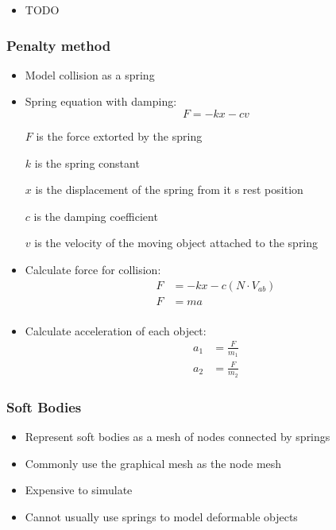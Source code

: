 \documentclass[a4paper]{article}
\begin{document}

\begin{itemize}
  \item
    TODO

\end{itemize}

\subsubsection{Penalty method}

\begin{itemize}
  \item
    Model collision as a spring

  \item
    Spring equation with damping:
    \[
      F = -kx - cv
    \]

    $F$ is the force extorted by the spring

    $k$ is the spring constant

    $x$ is the displacement of the spring from it s rest position

    $c$ is the damping coefficient

    $v$ is the velocity of the moving object attached to the spring

  \item
    Calculate force for collision:
    \begin{align*}
      F &= -kx - c(N \cdot V_{ab}) \\
      F &= ma \\
    \end{align*}

  \item
    Calculate acceleration of each object:
    \begin{align*}
      a_{1} &= \frac{F}{m_{1}} \\
      a_{2} &= \frac{F}{m_{2}}
    \end{align*}

\end{itemize}

\subsubsection{Soft Bodies}

\begin{itemize}
  \item
    Represent soft bodies as a mesh of nodes connected by springs

  \item
    Commonly use the graphical mesh as the node mesh

  \item
    Expensive to simulate

  \item
    Cannot usually use springs to model deformable objects

\end{itemize}
\end{document}
